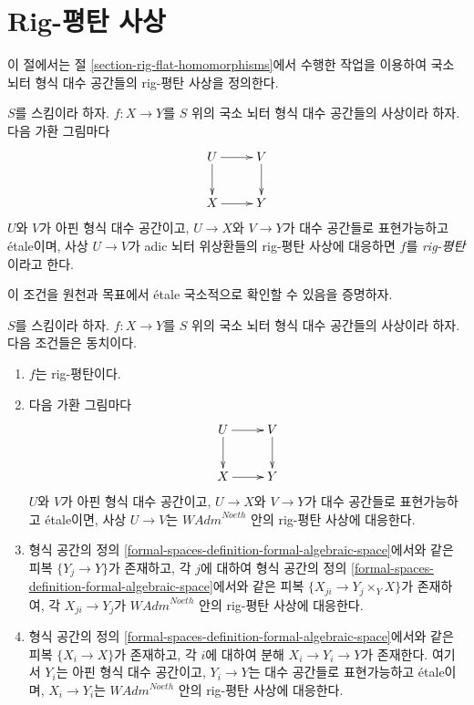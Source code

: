 \section{Rig-평탄 사상}
\label{section-rig-flat-morphisms}

\noindent
이 절에서는 절 \ref{section-rig-flat-homomorphisms}에서 수행한 작업을 이용하여
국소 뇌터 형식 대수 공간들의 rig-평탄 사상을 정의한다.

\begin{definition}
\label{definition-rig-flat}
$S$를 스킴이라 하자. $f : X \to Y$를 $S$ 위의 국소 뇌터
형식 대수 공간들의 사상이라 하자. 다음 가환 그림마다
$$
\xymatrix{
U \ar[d] \ar[r] & V \ar[d] \\
X \ar[r] & Y
}
$$
$U$와 $V$가 아핀 형식 대수 공간이고, $U \to X$와 $V \to Y$가
대수 공간들로 표현가능하고 \'etale이며, 사상 $U \to V$가
adic 뇌터 위상환들의 rig-평탄 사상에 대응하면 $f$를
{\it rig-평탄}이라고 한다.
\end{definition}

\noindent
이 조건을 원천과 목표에서 \'etale 국소적으로 확인할 수 있음을 증명하자.

\begin{lemma}
\label{lemma-rig-flat-morphisms}
$S$를 스킴이라 하자. $f : X \to Y$를 $S$ 위의 국소 뇌터
형식 대수 공간들의 사상이라 하자. 다음 조건들은 동치이다.
\begin{enumerate}
\item $f$는 rig-평탄이다.
\item 다음 가환 그림마다
$$
\xymatrix{
U \ar[d] \ar[r] & V \ar[d] \\
X \ar[r] & Y
}
$$
$U$와 $V$가 아핀 형식 대수 공간이고, $U \to X$와 $V \to Y$가
대수 공간들로 표현가능하고 \'etale이면, 사상 $U \to V$는
$\textit{WAdm}^{Noeth}$ 안의 rig-평탄 사상에 대응한다.
\item 형식 공간의 정의
\ref{formal-spaces-definition-formal-algebraic-space}에서와 같은
피복 $\{Y_j \to Y\}$가 존재하고, 각 $j$에 대하여 형식 공간의 정의
\ref{formal-spaces-definition-formal-algebraic-space}에서와 같은
피복 $\{X_{ji} \to Y_j \times_Y X\}$가 존재하여, 각
$X_{ji} \to Y_j$가 $\textit{WAdm}^{Noeth}$ 안의 rig-평탄 사상에 대응한다.
\item 형식 공간의 정의
\ref{formal-spaces-definition-formal-algebraic-space}에서와 같은
피복 $\{X_i \to X\}$가 존재하고, 각 $i$에 대하여 분해
$X_i \to Y_i \to Y$가 존재한다. 여기서 $Y_i$는 아핀 형식 대수 공간이고,
$Y_i \to Y$는 대수 공간들로 표현가능하고 \'etale이며,
$X_i \to Y_i$는 $\textit{WAdm}^{Noeth}$ 안의 rig-평탄 사상에 대응한다.
\end{enumerate}
\end{lemma}

